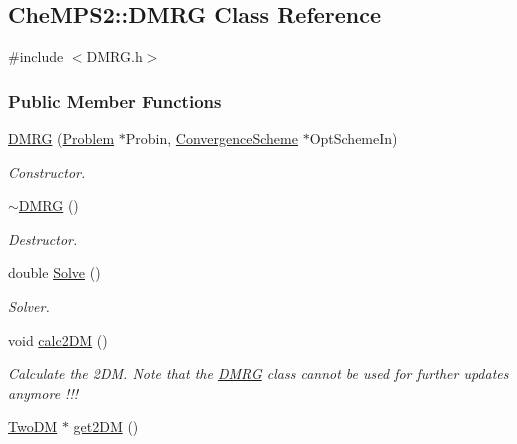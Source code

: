 \hypertarget{classCheMPS2_1_1DMRG}{\subsection{Che\-M\-P\-S2\-:\-:D\-M\-R\-G Class Reference}
\label{classCheMPS2_1_1DMRG}
}


{\ttfamily \#include $<$D\-M\-R\-G.\-h$>$}

\subsubsection*{Public Member Functions}
\begin{DoxyCompactItemize}
\item 
\hyperlink{classCheMPS2_1_1DMRG_af75174435718b0b533712fbeb6568c71}{D\-M\-R\-G} (\hyperlink{classCheMPS2_1_1Problem}{Problem} $\ast$Probin, \hyperlink{classCheMPS2_1_1ConvergenceScheme}{Convergence\-Scheme} $\ast$Opt\-Scheme\-In)
\begin{DoxyCompactList}\small\item\em Constructor. \end{DoxyCompactList}\item 
\hypertarget{classCheMPS2_1_1DMRG_abe701c20aeb97b48c237bed694d185b5}{\hyperlink{classCheMPS2_1_1DMRG_abe701c20aeb97b48c237bed694d185b5}{$\sim$\-D\-M\-R\-G} ()}\label{classCheMPS2_1_1DMRG_abe701c20aeb97b48c237bed694d185b5}

\begin{DoxyCompactList}\small\item\em Destructor. \end{DoxyCompactList}\item 
double \hyperlink{classCheMPS2_1_1DMRG_ab6d80dde8b71171ee969a6b7b86193d2}{Solve} ()
\begin{DoxyCompactList}\small\item\em Solver. \end{DoxyCompactList}\item 
\hypertarget{classCheMPS2_1_1DMRG_a35db8f58be5130548d5998ccbda4d37e}{void \hyperlink{classCheMPS2_1_1DMRG_a35db8f58be5130548d5998ccbda4d37e}{calc2\-D\-M} ()}\label{classCheMPS2_1_1DMRG_a35db8f58be5130548d5998ccbda4d37e}

\begin{DoxyCompactList}\small\item\em Calculate the 2\-D\-M. Note that the \hyperlink{classCheMPS2_1_1DMRG}{D\-M\-R\-G} class cannot be used for further updates anymore !!! \end{DoxyCompactList}\item 
\hypertarget{classCheMPS2_1_1DMRG_aa08c71dab6543ef820d13528fc354bcd}{\hyperlink{classCheMPS2_1_1TwoDM}{Two\-D\-M} $\ast$ \hyperlink{classCheMPS2_1_1DMRG_aa08c71dab6543ef820d13528fc354bcd}{get2\-D\-M} ()}\label{classCheMPS2_1_1DMRG_aa08c71dab6543ef820d13528fc354bcd}


\end{DoxyCompactItemize}
